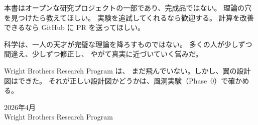本書はオープンな研究プロジェクトの一部であり、完成品ではない。
理論の穴を見つけたら教えてほしい。
実験を追試してくれるなら歓迎する。
計算を改善できるなら GitHub に PR を送ってほしい。

科学は、一人の天才が完璧な理論を降ろすものではない。
多くの人が少しずつ間違え、少しずつ修正し、
やがて真実に近づいていく営みだ。

Wright Brothers Research Program は、
まだ飛んでいない。しかし、翼の設計図はできた。
それが正しい設計図かどうかは、風洞実験（Phase~0）で確かめる。

\vspace{1em}
\begin{flushright}
2026年4月\\
Wright Brothers Research Program
\end{flushright}

\newpage
